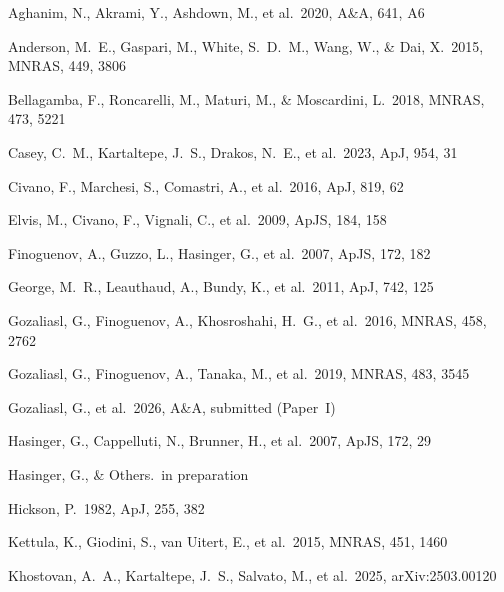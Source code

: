 \documentclass{aa}
\begin{document}

\begin{thebibliography}{}

 Aghanim, N., Akrami, Y., Ashdown, M., et al.\ 2020, A\&A, 641, A6

 Anderson, M.~E., Gaspari, M., White, S.~D.~M., Wang, W., \& Dai, X.\ 2015, MNRAS, 449, 3806

 Bellagamba, F., Roncarelli, M., Maturi, M., \& Moscardini, L.\ 2018, MNRAS, 473, 5221

 Casey, C.~M., Kartaltepe, J.~S., Drakos, N.~E., et al.\ 2023, ApJ, 954, 31

 Civano, F., Marchesi, S., Comastri, A., et al.\ 2016, ApJ, 819, 62

 Elvis, M., Civano, F., Vignali, C., et al.\ 2009, ApJS, 184, 158

 Finoguenov, A., Guzzo, L., Hasinger, G., et al.\ 2007, ApJS, 172, 182

 George, M.~R., Leauthaud, A., Bundy, K., et al.\ 2011, ApJ, 742, 125

 Gozaliasl, G., Finoguenov, A., Khosroshahi, H.~G., et al.\ 2016, MNRAS, 458, 2762

 Gozaliasl, G., Finoguenov, A., Tanaka, M., et al.\ 2019, MNRAS, 483, 3545

 Gozaliasl, G., et al.\ 2026, A\&A, submitted (Paper~I)

 Hasinger, G., Cappelluti, N., Brunner, H., et al.\ 2007, ApJS, 172, 29

 Hasinger, G., \& Others.\ in preparation

 Hickson, P.\ 1982, ApJ, 255, 382

 Kettula, K., Giodini, S., van Uitert, E., et al.\ 2015, MNRAS, 451, 1460

 Khostovan, A.~A., Kartaltepe, J.~S., Salvato, M., et al.\ 2025, arXiv:2503.00120


\end{thebibliography}
\end{document}
